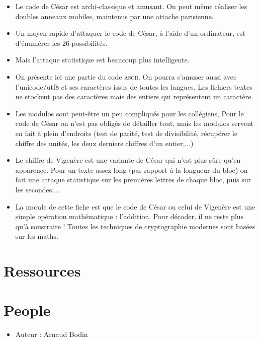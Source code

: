 \documentclass[class=report,crop=false, 12pt]{standalone}
\begin{document}
\begin{itemize}
  \item Le code de César est archi-classique et amusant. On peut même réaliser les doubles anneaux mobiles, maintenus par une attache parisienne.
  
  \item Un moyen rapide d'attaquer le code de César, à l'aide d'un ordinateur, est d'énumérer les 26 possibilités.
  
  \item Mais l'attaque statistique est beaucoup plus intelligente.
  
  \item On présente ici une partie du code \textsc{ascii}. On pourra s'amuser aussi avec l'unicode/utf8 et ses caractères issus de toutes les langues.
  Les fichiers textes ne stockent pas des caractères mais des entiers qui représentent un caractère.
  
  \item Les modulos sont peut-être un peu compliqués pour les collégiens, 
  Pour le code de César on n'est pas obligés de détailler tout, mais les modulos servent en fait à plein d'endroits (test de parité, test de divisibilité, récupérer le chiffre des unités, les deux derniers chiffres d'un entier,...)
  
  \item Le chiffre de Vigenère est une variante de César qui n'est plus sûre qu'en apparence. Pour un texte assez long (par rapport à la longueur du bloc) on fait une attaque statistique sur les premières lettres de chaque bloc, puis sur les secondes,... 
  
  \item La morale de cette fiche est que le code de César ou celui de Vigenère est une simple opération mathématique : l'addition. Pour décoder, il ne reste plus qu'à soustraire ! Toutes les techniques de cryptographie modernes sont basées sur les maths. 
\end{itemize}


\section*{Ressources}


\section*{People}

\begin{itemize}
  \item Auteur : Arnaud Bodin
\end{itemize}
\end{document}

